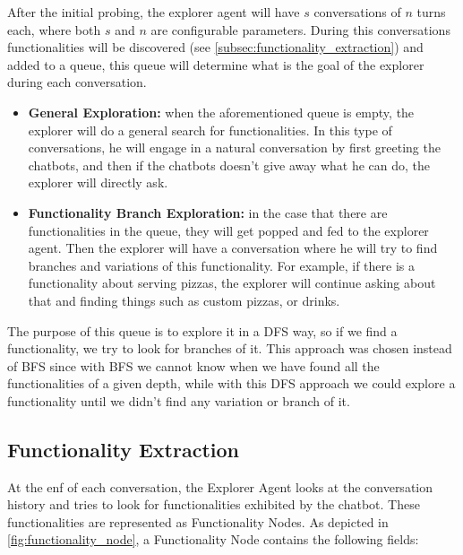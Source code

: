 After the initial probing,
the explorer agent will have $s$ conversations of $n$ turns each,
where both $s$ and $n$ are configurable parameters.
During this conversations functionalities will be discovered
(see \autoref{subsec:functionality_extraction})
and added to a queue,
this queue will determine what is the goal of the explorer
during each conversation.

\begin{itemize}
  \item \textbf{General Exploration:}
    when the aforementioned queue is empty,
    the explorer will do a general search for functionalities.
    In this type of conversations,
    he will engage in a natural conversation by first greeting the chatbots,
    and then if the chatbots doesn't give away what he can do,
    the explorer will directly ask.
  \item \textbf{Functionality Branch Exploration:}
    in the case that there are functionalities in the queue,
    they will get popped and fed to the explorer agent.
    Then the explorer will have a conversation
    where he will try to find branches and variations of this functionality.
    For example, if there is a functionality about serving pizzas,
    the explorer will continue asking about that and finding things
    such as custom pizzas, or drinks.
\end{itemize}

The purpose of this queue is to explore it in a \ac{DFS} way,
so if we find a functionality, we try to look for branches of it.
This approach was chosen instead of \ac{BFS}
since with \ac{BFS} we cannot know when we have found
all the functionalities of a given depth,
while with this \ac{DFS} approach we could explore a functionality
until we didn't find any variation or branch of it.

\subsection{Functionality Extraction}\label{subsec:functionality_extraction}

At the enf of each conversation,
the Explorer Agent looks at the conversation history
and tries to look for functionalities exhibited by the chatbot.
These functionalities are represented as Functionality Nodes.
As depicted in \autoref{fig:functionality_node},
a Functionality Node contains the following fields:

